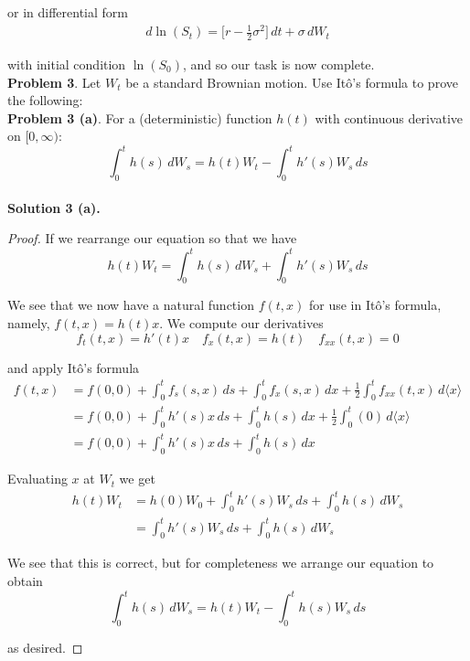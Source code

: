 \documentclass[12pt]{article}
\newlength\tindent
\renewcommand{\indent}{\hspace*{\tindent}}
\begin{document}
or in differential form
\begin{align*}
	d\ln(S_t) = \big[r - \frac{1}{2}\sigma^2\big]\,dt + \sigma\,dW_t
\end{align*}

with initial condition $\ln(S_0)$, and so our task is now complete. \\

{\bf Problem 3}. Let $W_t$ be a standard Brownian motion. Use It\^{o}'s formula to prove the following: \\

{\bf Problem 3 (a)}. 
For a (deterministic) function $h(t)$ with continuous derivative on $[0,\infty)$:
\begin{equation*}
	\int^t_0 h(s)\,dW_s = h(t)W_t - \int^t_0 h'(s)W_s\,ds
\end{equation*} \\

{\bf Solution 3 (a).}
\begin{proof} If we rearrange our equation so that we have
\begin{equation*}
	h(t)W_t = \int^t_0 h(s)\,dW_s + \int^t_0 h'(s)W_s\,ds
\end{equation*}	
	
\indent We see that we now have a natural function $f(t,x)$ for use in It\^{o}'s formula, namely, $f(t,x) = h(t)x$. We compute our derivatives
\begin{equation*}
	f_t(t,x) = h'(t)x \quad f_x(t,x) = h(t) \quad f_{xx}(t,x) = 0
\end{equation*}

and apply It\^{o}'s formula
\begin{align*}
	f(t,x) &= f(0,0) + \int^t_0 f_s(s,x)\,ds + \int^t_0 f_x(s,x)\,dx + \frac{1}{2}\int^t_0 f_{xx}(t,x)\,d\langle x\rangle \\
	&= f(0,0)  + \int^t_0 h'(s)x\,ds + \int^t_0 h(s)\,dx + \frac{1}{2}\int^t_0(0)\,d\langle x\rangle \\
	&= f(0,0)  + \int^t_0 h'(s)x\,ds + \int^t_0 h(s)\,dx 
\end{align*}	
	
Evaluating $x$ at $W_t$ we get
\begin{align*}
	h(t)W_t &= h(0)W_0 + \int^t_0 h'(s)W_s\,ds + \int^t_0 h(s)\,dW_s \\
			&= \int^t_0 h'(s)W_s\,ds + \int^t_0 h(s)\,dW_s
\end{align*}	
	
\indent We see that this is correct, but for completeness we arrange our equation to obtain
\begin{equation*}
	\int^t_0 h(s)\,dW_s = h(t)W_t - \int^t_0 h(s)W_s\,ds
\end{equation*}
	
as desired.
\end{proof}
\hfill\newline
\end{document}
